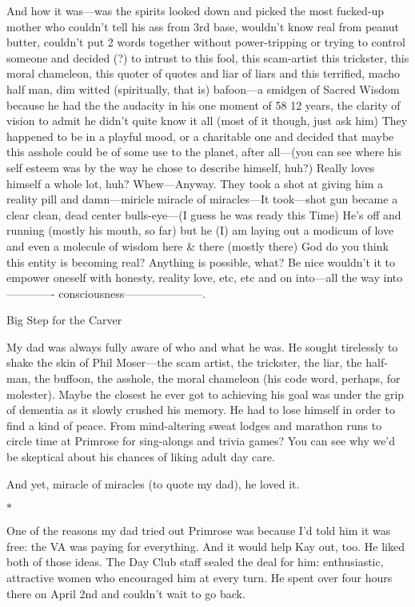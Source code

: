 \documentclass[12pt]{book}
\begin{document}
And how it was---was the spirits looked down and picked the most fucked-up mother who couldn't tell his ass from 3rd base, wouldn't know real from peanut butter, couldn't put 2 words together without power-tripping or trying to control someone and decided (?) to intrust to this fool, this scam-artist this trickster, this moral chameleon, this quoter of quotes and liar of liars and this terrified, macho half man, dim witted (spiritually, that is) bafoon---a smidgen of Sacred Wisdom because he had the the audacity in his one moment of 58 1\/2 years, the clarity of vision to admit he didn't quite know it all (most of it though, just ask him) They happened to be in a playful mood, or a charitable one and decided that maybe this asshole could be of some use to the planet, after all---(you can see where his self esteem was by the way he chose to describe himself, huh?) Really loves himself a whole lot, huh? Whew---Anyway. They took a shot at giving him a reality pill and damn---miricle miracle of miracles---It took---shot gun became a clear clean, dead center bulls-eye---(I guess he was ready this Time) He's off and running (mostly his mouth, so far) but he (I) am laying out a modicum of love and even a molecule of wisdom here \& there (mostly there) God do you think this entity is becoming real? Anything is possible, what? Be nice wouldn't it to empower oneself with honesty, reality love, etc, etc and on into---all the way into------------- consciousness---------------------.

Big Step for the Carver

My dad was always fully aware of who and what he was. He sought tirelessly to shake the skin of Phil Moser---the scam artist, the trickster, the liar, the half-man, the buffoon, the asshole, the moral chameleon (his code word, perhaps, for molester). Maybe the closest he ever got to achieving his goal was under the grip of dementia as it slowly crushed his memory. He had to lose himself in order to find a kind of peace. From mind-altering sweat lodges and marathon runs to circle time at Primrose for sing-alongs and trivia games? You can see why we'd be skeptical about his chances of liking adult day care.

And yet, miracle of miracles (to quote my dad), he loved it.

\begin{center}$*$\end{center}

One of the reasons my dad tried out Primrose was because I'd told him it was free: the VA was paying for everything. And it would help Kay out, too. He liked both of those ideas. The Day Club staff sealed the deal for him: enthusiastic, attractive women who encouraged him at every turn. He spent over four hours there on April 2nd and couldn't wait to go back.
\end{document}
